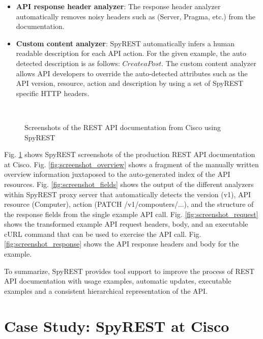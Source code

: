 \documentclass[10pt, conference]{IEEEtran}
\begin{document}
\begin{itemize}[leftmargin=*]
  \item \textbf{API response header analyzer}: The response header analyzer automatically removes noisy headers such as (Server, Pragma, etc.) from the documentation.

  \item \textbf{Custom content analyzer}: SpyREST automatically infers a human readable description for each API action. For the given example, the auto detected description is as follows: $Create a Post$. The custom content analyzer allows API developers to override the auto-detected attributes such as the API version, resource, action and description by using a set of SpyREST specific HTTP headers.
\end{itemize}

\begin{figure}
\\
\caption{Screenshots of the REST API documentation from Cisco using SpyREST}
\label{fig:screenshot}
\end{figure}

Fig. \ref{fig:screenshot} shows SpyREST screenshots of the production REST API documentation at Cisco. Fig. \ref{fig:screenshot_overview} shows a fragment of the manually written overview information juxtaposed to the auto-generated index of the API resources. Fig. \ref{fig:screenshot_fields} shows the output of the different analyzers within SpyREST proxy server that automatically detects the version (v1), API resource (Computer), action (PATCH /v1/compouters/...), and the structure of the response fields from the single example API call. Fig. \ref{fig:screenshot_request} shows the transformed example API request headers, body, and an executable cURL command that can be used to exercise the API call. Fig. \ref{fig:screenshot_response} shows the API response headers and body for the example.

To summarize, SpyREST provides tool support to improve the process of REST API documentation with usage examples, automatic updates, executable examples and a consistent hierarchical representation of the API.

\section{Case Study: SpyREST at Cisco}
\end{document}
